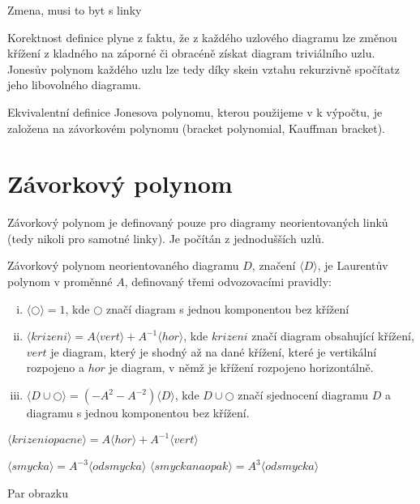 Zmena, musi to byt s linky

Korektnost definice plyne z faktu, že z každého uzlového diagramu lze změnou křížení z kladného na záporné či obracéně získat diagram triviálního uzlu. Jonesův polynom každého uzlu lze tedy díky skein vztahu rekurzivně spočítatz jeho libovolného diagramu.

Ekvivalentní definice Jonesova polynomu, kterou použijeme v k výpočtu, je založena na závorkovém polynomu (bracket polynomial, Kauffman bracket).

\section{Závorkový polynom}
Závorkový polynom je definovaný pouze pro diagramy neorientovaných linků (tedy nikoli pro samotné linky). Je počítán z jednodušších uzlů.

\begin{definice}\label{def01:2}
Závorkový polynom neorientovaného diagramu $D$, značení $\langle D \rangle$, je Laurentův polynom v proměnné $A$, definovaný třemi odvozovacími pravidly:
\begin{enumerate}[i.]
\item
$ \langle \bigcirc  \rangle = 1$, kde $\bigcirc$ značí diagram s jednou komponentou bez křížení
\item
$ \langle krizeni  \rangle = A  \langle vert \rangle + A^{-1}  \langle hor \rangle $, kde $krizeni$ značí diagram obsahující křížení, $vert$ je diagram, který je shodný až na dané křížení, které je vertikální rozpojeno a $hor$ je diagram, v němž je křížení rozpojeno horizontálně.
\item
$ \langle D \cup \bigcirc \rangle = (-A^2 - A^{-2}) \langle D \rangle$, kde $D \cup \bigcirc $ značí sjednocení diagramu $D$ a diagramu s jednou komponentou bez křížení.
\end{enumerate}

\end{definice}

\begin{dusl}
$ \langle krizeni opacne  \rangle = A  \langle hor \rangle + A^{-1}  \langle vert \rangle $
\end{dusl}

\begin{lemma}
$ \langle smycka \rangle = A^{-3} \langle odsmycka \rangle$
$ \langle smycka naopak \rangle = A^{3} \langle odsmycka \rangle$
\end{lemma}
\begin{dukaz}
Par obrazku
\end{dukaz}

